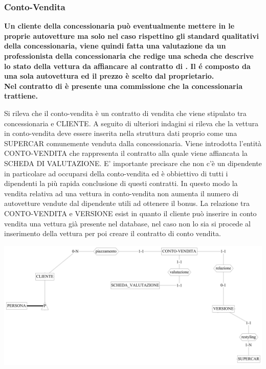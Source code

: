 \documentclass[11pt]{article}
\begin{document}
\subsubsection{Conto-Vendita}
\textbf{Un cliente della concessionaria può eventualmente mettere in
 le proprie autovetture ma solo nel caso rispettino
gli standard qualitativi della concessionaria, viene quindi fatta una
valutazione da un professionista della concessionaria che redige una scheda che
descrive lo stato della vettura da affiancare al contratto di
. Il  é composto da una
sola autovettura ed il prezzo è scelto dal proprietario.\\ 
Nel contratto di  è presente una commissione che la
concessionaria trattiene.}

Si rileva che il conto-vendita è un contratto di vendita che viene stipulato tra
concessionaria e CLIENTE. A seguito di ulteriori indagini si rileva che la
vettura in conto-vendita deve essere inserita nella struttura dati proprio come
una SUPERCAR comunemente venduta dalla concessionaria. Viene introdotta l'entità
CONTO-VENDITA che rappresenta il contratto alla quale viene affiancata la SCHEDA
DI VALUTAZIONE. E' importante precisare che non c’è un dipendente in particolare
ad occuparsi della conto-vendita ed è obbiettivo di tutti i dipendenti la più
rapida conclusione di questi contratti. In questo modo la vendita relativa ad
una vettura in conto-vendita non aumenta il numero di autovetture vendute dal
dipendente utili ad ottenere il bonus. La relazione tra CONTO-VENDITA e VERSIONE
esist in quanto il cliente può inserire in conto vendita una vettura già
presente nel database, nel caso non lo sia si procede al inserimento della
vettura per poi creare il contratto di conto vendita.

\begin{center}
    \includegraphics[width=\linewidth]{images/partialSchemes/contoVendita.png}
\end{center}
\end{document}
